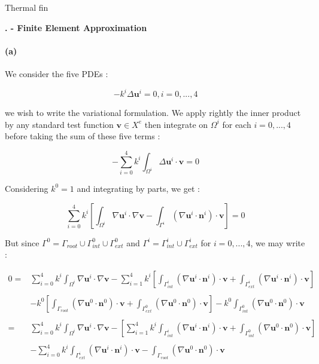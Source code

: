 \documentclass[a4paper]{article}
\date{}
\author{Philippe Ricka}
\title{}
\newcounter{c}
\newcounter{d}
\newcounter{r}
\newcounter{e}
\newcounter{sujet}
\newcommand{\chapitre}[1]{\stepcounter{c}\setcounter{e}{0}\setcounter{d}{0}\setcounter{r}{0}\bigskip\noindent\textbf{\Large\arabic{sujet}.\Roman{c} - #1}\\}
\newcommand{\bu}{\mathbf u}
\newcommand{\bv}{\mathbf v}
\begin{document}

\begin{center}\huge Thermal fin\end{center}

\bigskip

\chapitre{Finite Element Approximation}


\paragraph{(a)}We consider the five PDEs :

$$-k^i\Delta\bu^i=0,i=0,...,4$$


\noindent we wish to write the variational formulation. We apply rightly the inner product by any standard test function $\bv\in X^e$ then integrate on $\Omega^i$ for each $i=0,...,4$ before taking the sum of these five terms :

$$-\sum_{i=0}^4k^i\int_{\Omega^i}\Delta\bu^i\cdot\bv=0$$


Considering $k^0=1$ and integrating by parts, we get :

$$\sum_{i=0}^4k^i\left[\int_{\Omega^i}\nabla\bu^i\cdot\nabla\bv-\int_{\Gamma^i}(\nabla\bu^i\cdot\mathbf n^i)\cdot\bv\right]=0$$


But since $\Gamma^0=\Gamma_{root}\cup\Gamma^0_{int}\cup\Gamma^0_{ext}$ and $\Gamma^i=\Gamma^i_{int}\cup\Gamma^i_{ext}$ for $i=0,...,4$, we may write :

$$\begin{array}{rl}0=&\displaystyle\sum_{i=0}^4k^i\int_{\Omega^i}\nabla\bu^i\cdot\nabla\bv-\sum_{i=1}^4k^i\left[\int_{\Gamma^i_{int}}(\nabla\bu^i\cdot\mathbf n^i)\cdot\bv+\int_{\Gamma_{ext}^i}(\nabla\bu^i\cdot\mathbf n^i)\cdot\bv\right]\\
&\\
&\displaystyle-k^0\left[\int_{\Gamma_{root}}(\nabla\bu^0\cdot\mathbf n^0)\cdot\bv+\int_{\Gamma^0_{ext}}(\nabla\bu^0\cdot\mathbf n^0)\cdot\bv\right]-k^0\int_{\Gamma^0_{int}}(\nabla\bu^0\cdot\mathbf n^0)\cdot\bv\\
&\\
=&\displaystyle\sum_{i=0}^4k^i\int_{\Omega^i}\nabla\bu^i\cdot\nabla\bv-\left[\sum_{i=1}^4k^i\int_{\Gamma^i_{int}}(\nabla\bu^i\cdot\mathbf n^i)\cdot\bv+\int_{\Gamma^0_{int}}(\nabla\bu^0\cdot\mathbf n^0)\cdot\bv\right]\\
&\\
&\displaystyle-\sum_{i=0}^4k^i\int_{\Gamma^i_{ext}}(\nabla\bu^i\cdot\mathbf n^i)\cdot\bv-\int_{\Gamma_{root}}(\nabla\bu^0\cdot\mathbf n^0)\cdot\bv
\end{array}$$
\end{document}

